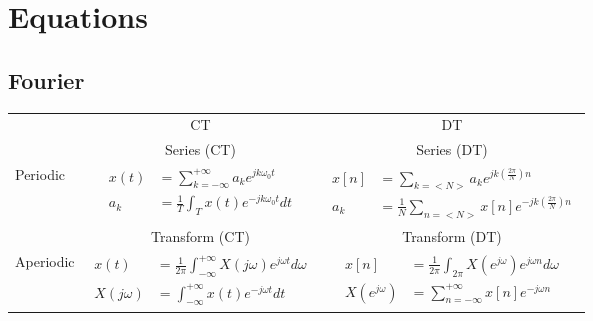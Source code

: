 \section*{Equations}
\subsection*{Fourier}
\centering
{\renewcommand{\arraystretch}{4}%
    \begin{tabular}{lcc}

    & CT & DT\\
        \cline{2-3}
    & Series (CT) & Series (DT)\\
    \cline{2-3}
    Periodic &
    $\begin{aligned}
        x(t) &= \sum_{k=-\infty}^{+\infty}a_k e^{jk\omega_0 t}\\
        a_k &= \frac{1}{T} \int_{T}x(t)e^{-jk\omega_0 t}dt
    \end{aligned}$\par

    &
    $\begin{aligned}
        x[n] &= \sum_{k=<N>}a_k e^{jk\left(\frac{2\pi}{N}\right) n}\\
        a_k &= \frac{1}{N} \sum_{n=<N>}x[n]e^{-jk\left(\frac{2\pi}{N}\right)n}
    \end{aligned}$\par
    \\[4ex]
        \cline{2-3}
     & Transform (CT) & Transform (DT)\\
    \cline{2-3}
    Aperiodic &
    $\begin{aligned}
        x(t) &= \frac{1}{2\pi}\int_{-\infty}^{+\infty} X(j\omega)e^{j\omega t}d\omega\\
        X(j\omega) &=  \int_{-\infty}^{+\infty}x(t)e^{-j\omega t}dt
    \end{aligned}$\par

    &


    $\begin{aligned}
        x[n] &= \frac{1}{2\pi}\int_{2\pi} X(e^{j\omega})e^{j\omega n}d\omega\\
        X(e^{j\omega}) &= \sum_{n=-\infty}^{+\infty}x[n]e^{-j\omega n}
    \end{aligned}$\par
    \\[4ex]
        \cline{2-3}
    \end{tabular}
    }
